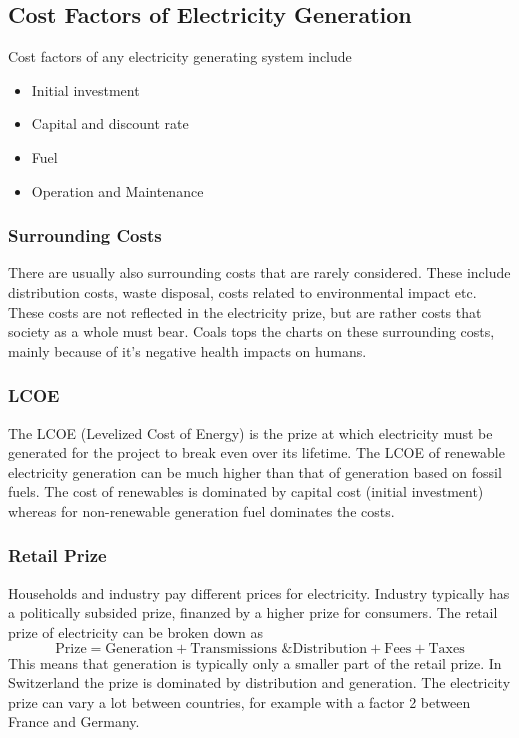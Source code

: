 \subsection{Cost Factors of Electricity Generation}

Cost factors of any electricity generating system include

\begin{itemize}
    \item Initial investment
    \item Capital and discount rate
    \item Fuel
    \item Operation and Maintenance
\end{itemize}

\subsubsection{Surrounding Costs}
There are usually also surrounding costs that are rarely considered. These include distribution costs, waste disposal, costs related to environmental impact etc.
These costs are not reflected in the electricity prize, but are rather costs that society as a whole must bear. Coals tops the charts on these surrounding costs, mainly because of it's negative health impacts on humans.\\

\subsubsection{LCOE}
The LCOE (Levelized Cost of Energy) is the prize at which electricity must be generated for the project to break even over its lifetime.
The LCOE of renewable electricity generation can be much higher than that of generation based on fossil fuels.
The cost of renewables is dominated by capital cost (initial investment) whereas for non-renewable generation fuel dominates the costs.

\subsubsection{Retail Prize}
Households and industry pay different prices for electricity.
Industry typically has a politically subsided prize, finanzed by a higher prize for consumers.
The retail prize of electricity can be broken down as
$$
\text{Prize} = \text{Generation} + \text{Transmissions \& Distribution} + \text{Fees} + \text{Taxes}
$$
This means that generation is typically only a smaller part of the retail prize.
In Switzerland the prize is dominated by distribution and generation. The electricity prize can vary a lot between countries, for example with a factor 2 between France and Germany.

